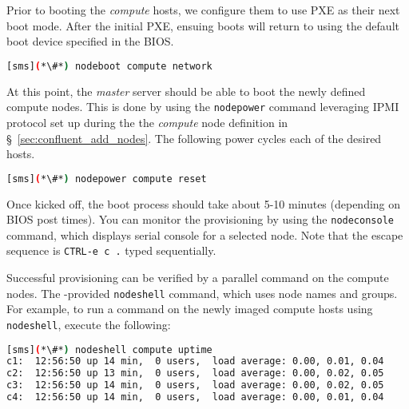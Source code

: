 Prior to booting the {\em compute} hosts, we configure them to use PXE as their
next boot mode. After the initial PXE, ensuing boots will return to using the default boot device
specified in the BIOS.

\begin{lstlisting}[language=bash,keywords={},upquote=true]
[sms](*\#*) nodeboot compute network
\end{lstlisting}

At this point, the {\em master} server should be able to boot the newly defined
compute nodes. This is done by using the \texttt{nodepower} \Confluent{} command
leveraging IPMI protocol set up during the the {\em compute} node definition
in \S~\ref{sec:confluent_add_nodes}. The following power cycles each of the
desired hosts.


\begin{lstlisting}[language=bash,keywords={},upquote=true]
[sms](*\#*) nodepower compute reset
\end{lstlisting}

Once kicked off, the boot process should take about 5-10
minutes (depending on BIOS post times).  You can monitor the
provisioning by using the \texttt{nodeconsole} command, which displays serial console
for a selected node. Note that the escape sequence
is \texttt{CTRL-e c .} typed sequentially.

Successful provisioning can be verified by a parallel command on the compute
nodes. The \Confluent{}-provided
\texttt{nodeshell} command, which uses \Confluent{} node names and groups.  
For example, to run a command on
the newly imaged compute hosts using \texttt{nodeshell}, execute the following:

\begin{lstlisting}[language=bash]
[sms](*\#*) nodeshell compute uptime
c1:  12:56:50 up 14 min,  0 users,  load average: 0.00, 0.01, 0.04
c2:  12:56:50 up 13 min,  0 users,  load average: 0.00, 0.02, 0.05
c3:  12:56:50 up 14 min,  0 users,  load average: 0.00, 0.02, 0.05
c4:  12:56:50 up 14 min,  0 users,  load average: 0.00, 0.01, 0.04
\end{lstlisting}
